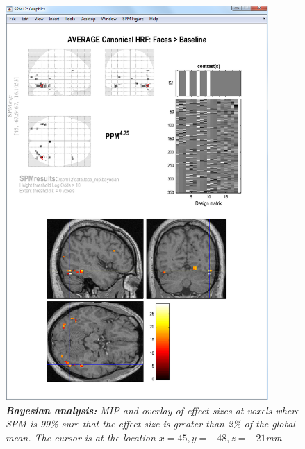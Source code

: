 \documentclass[a4paper,titlepage]{book}
\begin{document}
\begin{figure}
\begin{center}
\includegraphics[width=100mm]{face_bayes}
\caption{\em {\bf Bayesian analysis:} MIP and overlay of effect sizes at voxels 
where SPM is 99\% sure that the effect size is greater 
than 2\% of the global mean. The cursor is at the location $x=45,y=-48,z=-21$mm\label{face_bayes} }
\end{center}
\end{figure}
\end{document}
